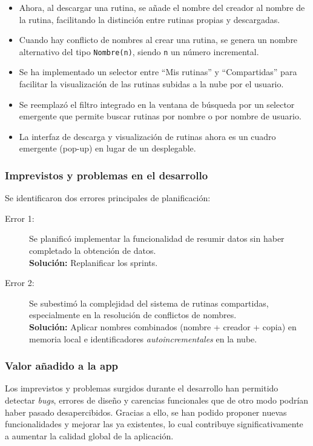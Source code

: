 \begin{itemize}
  \item Ahora, al descargar una rutina, se a\~nade el nombre del creador al nombre de la rutina, facilitando la distinci\'on entre rutinas propias y descargadas.
  \item Cuando hay conflicto de nombres al crear una rutina, se genera un nombre alternativo del tipo \texttt{Nombre(n)}, siendo \texttt{n} un n\'umero incremental.
  \item Se ha implementado un selector entre ``Mis rutinas'' y ``Compartidas'' para facilitar la visualizaci\'on de las rutinas subidas a la nube por el usuario.
  \item Se reemplaz\'o el filtro integrado en la ventana de b\'usqueda por un selector emergente que permite buscar rutinas por nombre o por nombre de usuario.
  \item La interfaz de descarga y visualizaci\'on de rutinas ahora es un cuadro emergente (pop-up) en lugar de un desplegable.
\end{itemize}

\subsubsection*{Imprevistos y problemas en el desarrollo}
Se identificaron dos errores principales de planificaci\'on:

\begin{description}
  \item[Error 1:] Se planific\'o implementar la funcionalidad de resumir datos sin haber completado la obtenci\'on de datos. \\ \textbf{Soluci\'on:} Replanificar los sprints.
  \item[Error 2:] Se subestim\'o la complejidad del sistema de rutinas compartidas, especialmente en la resoluci\'on de conflictos de nombres. \\ \textbf{Soluci\'on:} Aplicar nombres combinados (nombre + creador + copia) en memoria local e identificadores \textit{autoincrementales} en la nube.
\end{description}

\subsubsection*{Valor a\~nadido a la app}
Los imprevistos y problemas surgidos durante el desarrollo han permitido detectar \textit{bugs}, errores de dise\~no y carencias funcionales que de otro modo podr\'ian haber pasado desapercibidos. Gracias a ello, se han podido proponer nuevas funcionalidades y mejorar las ya existentes, lo cual contribuye significativamente a aumentar la calidad global de la aplicaci\'on.

